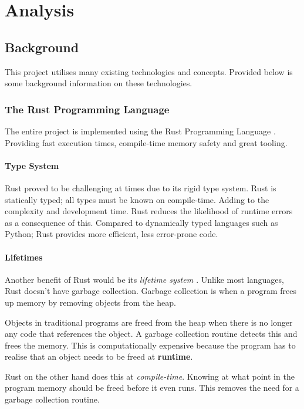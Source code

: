 \documentclass[a4paper,12pt]{report}
\begin{document}
\chapter{Analysis}

\section{Background}

This project utilises many existing technologies and concepts. Provided below is some background information on these technologies.

\subsection{The Rust Programming Language}

The entire project is implemented using the Rust Programming Language \cite{rust}. Providing fast execution times, compile-time memory safety
and great tooling.

\subsubsection{Type System}
Rust proved to be challenging at times due to its rigid type system. Rust is statically typed; all types must be known on compile-time. Adding to the complexity and development time. Rust reduces the likelihood of runtime errors as a consequence of this. Compared to dynamically typed languages such as Python; Rust provides more efficient, less error-prone code.

\subsubsection{Lifetimes}
Another benefit of Rust would be its \textit{lifetime system \cite{lifetimes}}. Unlike most languages, Rust doesn't have garbage collection. 
Garbage collection is when a program frees up memory by removing objects from the heap. 

Objects in traditional programs are freed from the heap when there is no longer any code that references the object.
A garbage collection routine detects this and frees the memory.
This is computationally expensive because the program has to realise that an object needs to be freed at \textbf{runtime}.

Rust on the other hand does this at \textit{compile-time}. Knowing at what point in the program memory should be freed before it even runs. This removes the need for a garbage collection routine.
\end{document}
